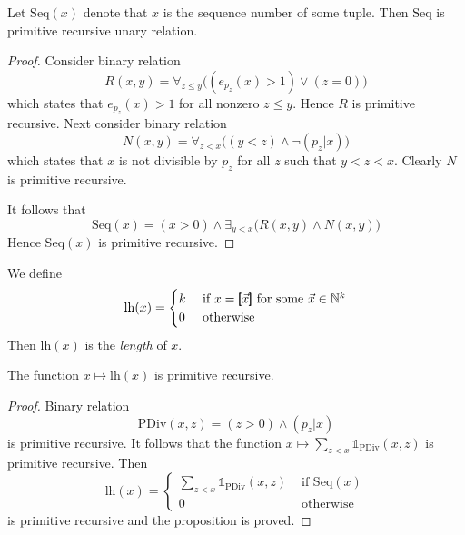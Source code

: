 \documentclass[10pt]{amsart}
\begin{document}
\begin{proposition}\label{proposition:tuple_codes_are_primitive_recursive}
	Let $\mathrm{Seq}(x)$ denote that $x$ is the sequence number of some tuple. Then $\mathrm{Seq}$ is primitive recursive unary relation.
\end{proposition}
\begin{proof}
	Consider binary relation
	$$R(x,y) = \forall_{z \leq y}\bigg(\left(e_{p_z}(x) > 1\right)\vee\left(z = 0\right)\bigg)$$
	which states that $e_{p_z}(x) > 1$ for all nonzero $z \leq y$. Hence $R$ is primitive recursive. Next consider binary relation
	$$N(x,y) = \forall_{z < x}\bigg(\left(y < z\right)\wedge \neg\left(p_z|x\right)\bigg)$$
	which states that $x$ is not divisible by $p_z$ for all $z$ such that $y < z < x$. Clearly $N$ is primitive recursive.

	It follows that
	$$\mathrm{Seq}(x) = \left(x > 0\right) \wedge \exists_{y < x}\bigg(R(x,y)\wedge N(x,y)\bigg)$$
	Hence $\mathrm{Seq}(x)$	is primitive recursive.
\end{proof}

\begin{definition}
	We define
	$$\mathrm{lh}(x) = \begin{cases}
			k & \mbox{ if }x = \pmb{[}\vec{x}\pmb{]}\mbox{ for some }\vec{x} \in {\mathbb N}^k \\
			0 & \mbox{ otherwise }                                                     \\
		\end{cases}
	$$
	Then $\mathrm{lh}(x)$ is the \textit{length} of $x$.
\end{definition}

\begin{proposition}\label{proposition:length_is_primitive_recursive}
	The function $x \mapsto \mathrm{lh}(x)$ is primitive recursive.
\end{proposition}
\begin{proof}
	Binary relation
	$$\mathrm{PDiv}(x,z) = \left(z > 0\right)\wedge \left(p_z|x\right)$$
	is primitive recursive. It follows that the function $x \mapsto \sum_{z < x}\mathbb{1}_{\mathrm{PDiv}}(x,z)$ is primitive recursive. Then
	$$\mathrm{lh}(x) = \begin{cases}
			\sum_{z < x}\mathbb{1}_{\mathrm{PDiv}}(x,z) & \mbox{ if }\mathrm{Seq}(x) \\
			0                                           & \mbox{ otherwise }
		\end{cases}$$
	is primitive recursive and the proposition is proved.
\end{proof}
\end{document}
